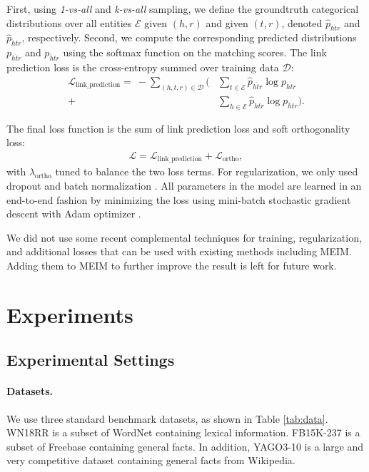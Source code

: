 \documentclass{article}
\def\gD{{\mathcal{D}}}
\def\gE{{\mathcal{E}}}
\def\gL{{\mathcal{L}}}
\theoremstyle{plain}
\theoremstyle{remark}
\begin{document}
First, using \textit{1-vs-all} and \textit{k-vs-all} sampling, we define the groundtruth categorical distributions over all entities $ \gE $ given $ (h, r) $ and given $ (t, r) $, denoted $ \hat{p}_{h\dot{t}r} $ and $ \hat{p}_{\dot{h}tr} $, respectively. Second, we compute the corresponding predicted distributions $ p_{h\dot{t}r} $ and $ p_{\dot{h}tr} $ using the softmax function on the matching scores. The link prediction loss is the cross-entropy summed over training data $ \gD $:
\begin{align} \label{eq:loss_fullcrossentropy}
\gL_{\text{link\_prediction}} =\ - \textstyle\sum_{(h, t, r) \in \gD} \bigl( &\textstyle\sum_{\dot{t} \in \gE} \hat{p}_{h\dot{t}r} \log p_{h\dot{t}r} \nonumber\\
+ &\textstyle\sum_{\dot{h} \in \gE} \hat{p}_{\dot{h}tr} \log p_{\dot{h}tr} \bigr).
\end{align} 

The final loss function is the sum of link prediction loss and soft orthogonality loss: 
\begin{align} \label{eq:loss}
\gL = \gL_{\text{link\_prediction}} + \gL_{\text{ortho}},
\end{align} 
with $ \lambda_{\text{ortho}} $ tuned to balance the two loss terms. For regularization, we only used dropout \cite{srivastava_dropoutsimpleway_2014} and batch normalization \cite{ioffe_batchnormalizationaccelerating_2015}. All parameters in the model are learned in an end-to-end fashion by minimizing the loss using mini-batch stochastic gradient descent with Adam optimizer \cite{kingma_adammethodstochastic_2015}. 

We did not use some recent complemental techniques for training, regularization, and additional losses that can be used with existing methods including MEIM. Adding them to MEIM to further improve the result is left for future work.


\section{Experiments} \label{sect:experiment}
\subsection{Experimental Settings} \label{sect:expsetting} \paragraph{Datasets.} We use three standard benchmark datasets, as shown in Table \ref{tab:data}. WN18RR \cite{dettmers_convolutional2dknowledge_2018} is a subset of WordNet containing lexical information. FB15K-237 \cite{toutanova_observedlatentfeatures_2015} is a subset of Freebase containing general facts. In addition, YAGO3-10 \cite{mahdisoltani_yago3knowledgebase_2015} is a large and very competitive dataset containing general facts from Wikipedia.
\end{document}
